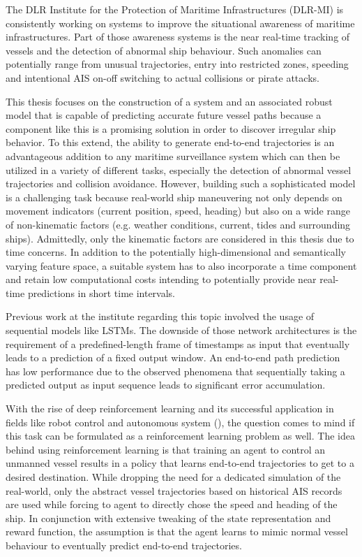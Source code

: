 The DLR Institute for the Protection of Maritime Infrastructures (DLR-MI) is consistently working on systems to improve the situational awareness of maritime infrastructures. Part of those awareness systems is the near real-time tracking of vessels and the detection of abnormal ship behaviour. Such anomalies can potentially range from unusual trajectories, entry into restricted zones, speeding and intentional AIS on-off switching to actual collisions or pirate attacks.
\par
This thesis focuses on the construction of a system and an associated robust model that is capable of predicting accurate future vessel paths because a component like this is a promising solution in order to discover irregular ship behavior. To this extend, the ability to generate end-to-end trajectories is an advantageous addition to any maritime surveillance system which can then be utilized in a variety of different tasks, especially the detection of abnormal vessel trajectories and collision avoidance.
However, building such a sophisticated model is a challenging task because real-world ship maneuvering not only depends on movement indicators (current position, speed, heading) but also on a wide range of non-kinematic factors (e.g. weather conditions, current, tides and surrounding ships). Admittedly, only the kinematic factors are considered in this thesis due to time concerns. In addition to the potentially high-dimensional and semantically varying feature space, a suitable system has to also incorporate a time component and retain low computational costs intending to potentially provide near real-time predictions in short time intervals.
\par
Previous work at the institute regarding this topic involved the usage of sequential models like LSTMs. The downside of those network architectures is the requirement of a predefined-length frame of timestamps as input that eventually leads to a prediction of a fixed output window. An end-to-end path prediction has low performance due to the observed phenomena that sequentially taking a predicted output as input sequence leads to significant error accumulation.
\par
With the rise of deep reinforcement learning and its successful application in fields like robot control and autonomous system (\cite{s18092905, zare2021continuous, 9195789, martinsen2018curved}), the question comes to mind if this task can be formulated as a reinforcement learning problem as well. The idea behind using reinforcement learning is that training an agent to control an unmanned vessel results in a policy that learns end-to-end trajectories to get to a desired destination. While dropping the need for a dedicated simulation of the real-world, only the abstract vessel trajectories based on historical AIS records are used while forcing to agent to directly chose the speed and heading of the ship. In conjunction with extensive tweaking of the state representation and reward function, the assumption is that the agent learns to mimic normal vessel behaviour to eventually predict end-to-end trajectories.
